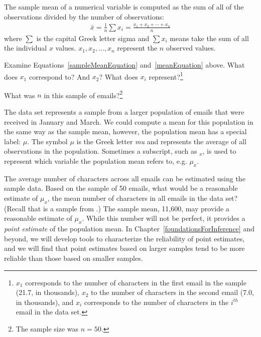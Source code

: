 \begin{termBox}{
The sample mean of a numerical variable is computed as the sum of all of the observations divided by the number of observations:
\begin{eqnarray}
\bar{x} = \frac{1}{n}\sum{x_{i}} = \frac{x_1+x_2+\cdots+x_n}{n}
\label{meanEquation}
\end{eqnarray}
where $\sum$ is the capital Greek letter sigma and $\sum{x_{i}}$ means take the sum of all the individual $x$ values.
 $x_1, x_2, \dots, x_n$ represent the $n$ observed values.}
\end{termBox}

\begin{exercise}
Examine Equations~\eqref{sampleMeanEquation} and~\eqref{meanEquation} above. What does $x_1$ correspond to? And $x_2$? What does $x_i$ represent?\footnote{$x_1$ corresponds to the number of characters in the first email in the sample (21.7, in thousands), $x_2$ to the number of characters in the second email (7.0, in thousands), and $x_i$ corresponds to the number of characters in the $i^{th}$ email in the data set.}
\end{exercise}

\begin{exercise}
What was $n$ in this sample of emails?\footnote{The sample size was $n=50$.}
\end{exercise}

The  data set represents a sample from a larger population of emails that were received in January and March. We could compute a mean for this population in the same way as the sample mean, however, the population mean has a special label: $\mu$.  The symbol $\mu$ is the Greek letter \emph{mu} and represents the average of all observations in the population. Sometimes a subscript, such as $_x$, is used to represent which variable the population mean refers to, e.g. $\mu_x$.

\textA{\pagebreak}

\begin{example}{The average number of characters across all emails can be estimated using the sample data. Based on the sample of 50 emails, what would be a reasonable estimate of $\mu_x$, the mean number of characters in all emails in the  data set? (Recall that  is a sample from .)}
The sample mean, 11,600, may provide a reasonable estimate of $\mu_x$. While this number will not be perfect, it provides a \emph{point estimate} of the population mean. In Chapter~\ref{foundationsForInference} and beyond, we will develop tools to characterize the reliability of point estimates, and we will find that point estimates based on larger samples tend to be more reliable than those based on smaller samples.
\end{example}

